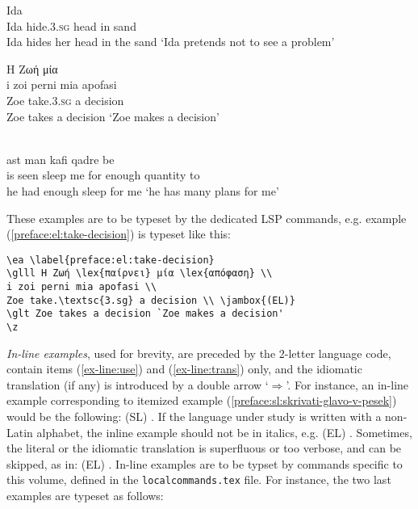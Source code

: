 \documentclass[output=paper,
modfonts,
]{langscibook}
\begin{document}
\ea \label{preface:sl:skrivati-glavo-v-pesek}
\gll Ida     \\
Ida hide.\textsc{3.sg} head in sand \\ 
\glt Ida hides her head in the sand `Ida pretends not to see a problem’
\z

\ea \label{preface:el:take-decision}
\glll Η Ζωή  μία  \\
i zoi perni mia apofasi \\
Zoe take.\textsc{3.sg} a decision \\ 
\glt Zoe takes a decision `Zoe makes a decision'
\z

\ea \label{preface:fa:have-sleep-for-sb}
\glll{}        \\
ast   man  kafi qadre be  \\
is seen sleep me for enough quantity to\\ 
\glt he had enough sleep for me `he has many plans for me’
\z


These examples are to be typeset by the dedicated LSP commands, e.g. example (\ref{preface:el:take-decision}) is typeset like this:

\begin{verbatim}
\ea \label{preface:el:take-decision}
\glll Η Ζωή \lex{παίρνει} μία \lex{απόφαση} \\
i zoi perni mia apofasi \\
Zoe take.\textsc{3.sg} a decision \\ \jambox{(EL)}
\glt Zoe takes a decision `Zoe makes a decision'
\z
\end{verbatim}


\emph{In-line examples}, used for brevity, are preceded by the 2-letter language code, contain items (\ref{ex-line:use}) and (\ref{ex-line:trans}) only, and the idiomatic translation (if any) is introduced by a double arrow `$\Rightarrow$'. For instance, an in-line example corresponding to itemized example (\ref{preface:sl:skrivati-glavo-v-pesek}) would be the following: (SL) . If the language under study is written with a non-Latin alphabet, the inline example should not be in italics, e.g. (EL) . Sometimes, the literal or the idiomatic translation is superfluous or too verbose, and can be skipped, as in:  (EL) . In-line examples are to be typset by commands specific to this volume, defined in the \texttt{localcommands.tex} file. For instance, the two last examples are typeset as follows:
\end{document}
